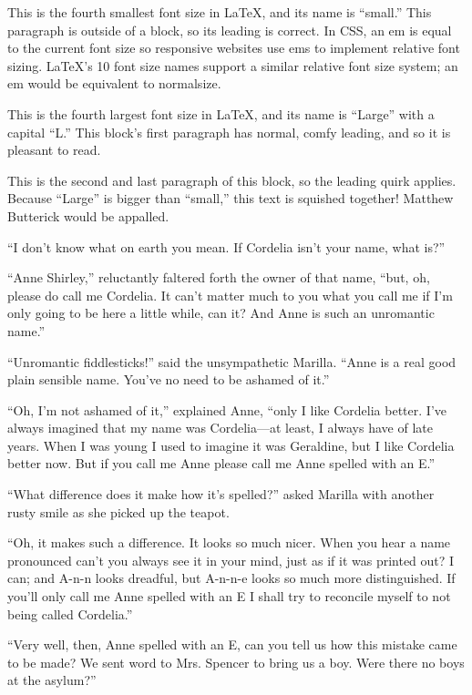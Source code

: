 \documentclass[a4paper]{article}
\begin{document}
\small This is the fourth smallest font size in \LaTeX, and its name is ``small.'' This paragraph is outside of a block, so its leading is correct. In CSS, an em is equal to the current font size so responsive websites use ems to implement relative font sizing. \LaTeX's 10 font size names support a similar relative font size system; an em would be equivalent to normalsize.

{\Large This is the fourth largest font size in \LaTeX, and its name is ``Large'' with a capital ``L.'' This block's first paragraph has normal, comfy leading, and so it is pleasant to read.

This is the second and last paragraph of this block, so the leading quirk applies. Because ``Large'' is bigger than ``small,'' this text is squished together! Matthew Butterick would be appalled.}



\Huge ``I don't know what on earth you mean. If Cordelia isn't your name, what is?''

{\tiny ``Anne Shirley,'' reluctantly faltered forth the owner of that name, ``but, oh, please do call me Cordelia. It can't matter much to you what you call me if I'm only going to be here a little while, can it? And Anne is such an unromantic name.''}

\huge ``Unromantic fiddlesticks!'' said the unsympathetic Marilla. ``Anne is a real good plain sensible name. You've no need to be ashamed of it.''

{\scriptsize ``Oh, I'm not ashamed of it,'' explained Anne, ``only I like Cordelia better. I've always imagined that my name was Cordelia---at least, I always have of late years. When I was young I used to imagine it was Geraldine, but I like Cordelia better now. But if you call me Anne please call me Anne spelled with an E.''

``What difference does it make how it's spelled?'' asked Marilla with another rusty smile as she picked up the teapot.

``Oh, it makes such a difference. It looks so much nicer. When you hear a name pronounced can't you always see it in your mind, just as if it was printed out? I can; and A-n-n looks dreadful, but A-n-n-e looks so much more distinguished. If you'll only call me Anne spelled with an E I shall try to reconcile myself to not being called Cordelia.''}

\footnotesize ``Very well, then, Anne spelled with an E, can you tell us how this mistake came to be made? We sent word to Mrs. Spencer to bring us a boy. Were there no boys at the asylum?''
\end{document}
